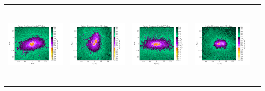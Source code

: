 \begin{tabular}{c c c c c}
\hspace*{-1cm} \includegraphics[height=4cm,width=4cm,trim={2.5cm 1.5cm 5cm 1.5cm},clip]{../pngs/D1.png}  & 
 \hspace*{-0.3cm}\includegraphics[height=4cm,width=4cm,trim={2.5cm 1.5cm 5cm 1.5cm},clip]{../pngs/D6.png}  & 
 \hspace*{-0.3cm}\includegraphics[height=4cm,width=4cm,trim={2.5cm 1.5cm 5cm 1.5cm},clip]{../pngs/D7.png}  & 
 \hspace*{-0.3cm}\includegraphics[height=4cm,width=4cm,trim={2.5cm 1.5cm 5cm 1.5cm},clip]{../pngs/D8.png}  & 
  \hspace*{-0.3cm}\multirow{6}{*}

\end{tabular}
